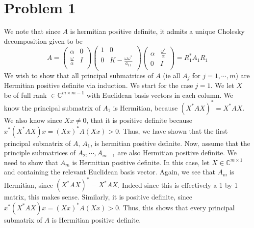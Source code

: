 \documentclass[12pt,a4paper,twoside]{article}
\begin{document}
\section{Problem 1}
We note that since $A$ is hermitian positive definite, it admits a unique Cholesky decomposition given to be
\begin{equation}
A=\begin{pmatrix}
\alpha & 0 \\
\frac{\omega}{\alpha}&I\\
\end{pmatrix}
\begin{pmatrix}
1 & 0 \\
0 & K-\frac{\omega \omega^*}{a_{11}} \\
\end{pmatrix}
\begin{pmatrix}
\alpha & \frac{\omega^*}{\alpha}\\
0& I \\
\end{pmatrix} = R_1^* A_1 R_1
\end{equation} 
We wish to show that all principal submatrices of $A$ (ie all $A_{j}$ for $j=1,\cdots,m$) are Hermitian positive definite via induction. We start for the case $j=1$. We let $X$ be of full rank $\in \mathbb{C}^{m\times m-1}$ with Euclidean basis vectors in each column. We know the principal submatrix of  $A_1$ is Hermitian, because $(X^*AX)^* = X^*AX$. We also know since $Xx\neq 0$, that it is positive definite because $x^*(X^*AX)x =(Xx)^* A(Xx) > 0$. Thus, we have shown that the first principal submatrix of $A$, $A_1$, is hermitian positive definite. Now, assume that the principle submatrices of $A_2,\cdots, A_{m-1}$ are also Hermitian positive definite. We need to show that $A_m$ is Hermitian positive definite. In this case, let $X\in \mathbb{C}^{m\times 1}$ and containing the relevant Euclidean basis vector. Again, we see that $A_m$ is Hermitian, since $(X^*AX)^* = X^*AX$. Indeed since this is effectively a 1 by 1 matrix, this makes sense. Similarly, it is positive definite, since $x^*(X^*AX)x =(Xx)^* A(Xx) > 0$. Thus, this shows that every principal submatrix of $A$ is Hermitian positive definite. 
\end{document}
